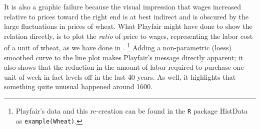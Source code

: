It is also a graphic failure because the visual impression that wages increased relative to prices
toward the right end is at best indirect and is obscured by the large fluctuations in prices of wheat.
What Playfair might have done to show the relation directly, is to plot the \emph{ratio} of price to wages,
representing the labor cost of a unit of wheat, as we have done in .%
\footnote{
Playfair's data and this re-creation can be found in the \texttt{R} package HistData \citep{HistData}
as \texttt{example(Wheat)}.
}
Adding a non-parametric (loess) smoothed curve to the line plot makes Playfair's message directly apparent;
it also shows that the reduction in the amount of labor required to purchase one unit of week in fact
levels off in the last 40 years. As well, it highlights that something quite unusual happened around 1600.
